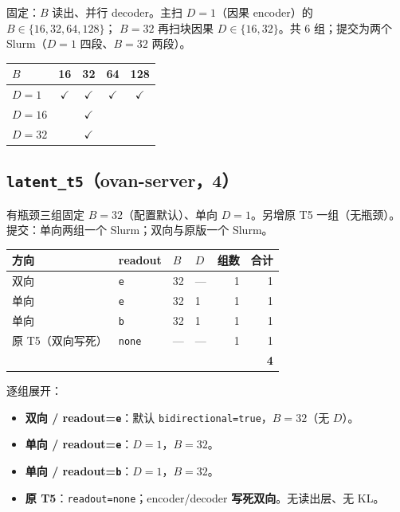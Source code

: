 \documentclass[UTF8,a4paper,11pt]{ctexart}
\begin{document}
固定：$B$ 读出、并行 decoder。主扫 $D{=}1$（因果 encoder）的 $B{\in}\{16,32,64,128\}$；
$B{=}32$ 再扫块因果 $D{\in}\{16,32\}$。共 6 组；提交为两个 Slurm（$D{=}1$ 四段、$B{=}32$ 两段）。

\begin{center}
\small
\begin{tabular}{lcccc}
\toprule
$B$ & 16 & 32 & 64 & 128 \\
\midrule
$D{=}1$ & $\checkmark$ & $\checkmark$ & $\checkmark$ & $\checkmark$ \\
$D{=}16$ &  & $\checkmark$ &  &  \\
$D{=}32$ &  & $\checkmark$ &  &  \\
\bottomrule
\end{tabular}
\end{center}

\subsection{\texttt{latent\_t5}（ovan-server，4）}

有瓶颈三组固定 $B{=}32$（配置默认）、单向 $D{=}1$。另增原 T5 一组（无瓶颈）。
提交：单向两组一个 Slurm；双向与原版一个 Slurm。

\begin{center}
\small
\begin{tabular}{llllrr}
\toprule
方向 & readout & $B$ & $D$ & 组数 & 合计 \\
\midrule
双向 & \texttt{e} & 32 & --- & 1 & 1 \\
单向 & \texttt{e} & 32 & 1 & 1 & 1 \\
单向 & \texttt{b} & 32 & 1 & 1 & 1 \\
原 T5（双向写死） & \texttt{none} & --- & --- & 1 & 1 \\
\midrule
 &  &  &  &  & \textbf{4} \\
\bottomrule
\end{tabular}
\end{center}

逐组展开：

\begin{itemize}
  \item \textbf{双向 / readout=\texttt{e}}：默认 \texttt{bidirectional=true}，$B{=}32$（无 $D$）。
  \item \textbf{单向 / readout=\texttt{e}}：$D{=}1$，$B{=}32$。
  \item \textbf{单向 / readout=\texttt{b}}：$D{=}1$，$B{=}32$。
  \item \textbf{原 T5}：\texttt{readout=none}；encoder/decoder \textbf{写死双向}。无读出层、无 KL。
\end{itemize}
\end{document}
